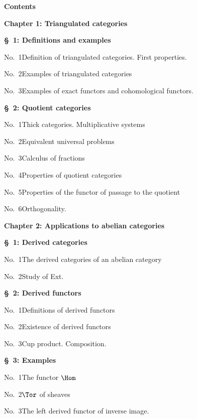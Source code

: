 \begin{center}\textbf{Contents}\end{center}
\begin{center}\textbf{Chapter 1: Triangulated categories}\end{center}
\noindent\textbf{\S~1: Definitions and examples}\par
\noindent No.~1\quad Definition of triangulated categories. First properties.\par
\noindent No.~2\quad Examples of triangulated categories\par
\noindent No.~3\quad Examples of exact functors and cohomological functors.\par
\medskip\noindent\textbf{\S~2: Quotient categories}\par
\noindent No.~1\quad Thick categories. Multiplicative systems\par
\noindent No.~2\quad Equivalent universal problems\par
\noindent No.~3\quad Calculus of fractions\par
\noindent No.~4\quad Properties of quotient categories\par
\noindent No.~5\quad Properties of the functor of passage to the quotient\par
\noindent No.~6\quad Orthogonality.\par
\begin{center}\textbf{Chapter 2: Applications to abelian categories}\end{center}
\noindent\textbf{\S~1: Derived categories}\par
\noindent No.~1\quad The derived categories of an abelian category\par
\noindent No.~2\quad Study of Ext.\par
\medskip\noindent\textbf{\S~2: Derived functors}\par
\noindent No.~1\quad Definitions of derived functors\par
\noindent No.~2\quad Existence of derived functors\par
\noindent No.~3\quad Cup product. Composition.\par
\medskip\noindent\textbf{\S~3: Examples}\par
\noindent No.~1\quad The functor $\Hom$\par
\noindent No.~2\quad $\Tor$ of sheaves\par
\noindent No.~3\quad The left derived functor of inverse image.\par

